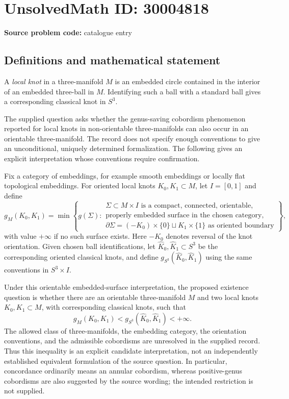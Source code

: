 \documentclass[11pt]{article}
\begin{document}
\section*{UnsolvedMath ID: 30004818}
\textbf{Source problem code:} catalogue entry
\subsection{Definitions and mathematical statement}
A \emph{local knot} in a three-manifold \(M\) is an embedded circle contained in the interior of an embedded three-ball in \(M\). Identifying such a ball with a standard ball gives a corresponding classical knot in \(S^3\).

The supplied question asks whether the genus-saving cobordism phenomenon reported for local knots in non-orientable three-manifolds can also occur in an orientable three-manifold. The record does not specify enough conventions to give an unconditional, uniquely determined formalization. The following gives an explicit interpretation whose conventions require confirmation.

Fix a category of embeddings, for example smooth embeddings or locally flat topological embeddings. For oriented local knots \(K_0,K_1\subset M\), let \(I=[0,1]\) and define
\[
 g_M(K_0,K_1)=\min\left\{g(\Sigma):\begin{array}{l}
 \Sigma\subset M\times I\text{ is a compact, connected, orientable,}\\
 \text{properly embedded surface in the chosen category,}\\
 \partial\Sigma=(-K_0)\times\{0\}\sqcup K_1\times\{1\}
 \text{ as oriented boundary}
 \end{array}\right\},
\]
with value \(+\infty\) if no such surface exists. Here \(-K_0\) denotes reversal of the knot orientation. Given chosen ball identifications, let \(\widehat K_0,\widehat K_1\subset S^3\) be the corresponding oriented classical knots, and define \(g_{S^3}(\widehat K_0,\widehat K_1)\) using the same conventions in \(S^3\times I\).

Under this orientable embedded-surface interpretation, the proposed existence question is whether there are an orientable three-manifold \(M\) and two local knots \(K_0,K_1\subset M\), with corresponding classical knots, such that
\[
 g_M(K_0,K_1)<g_{S^3}(\widehat K_0,\widehat K_1)<+\infty.
\]
The allowed class of three-manifolds, the embedding category, the orientation conventions, and the admissible cobordisms are unresolved in the supplied record. Thus this inequality is an explicit candidate interpretation, not an independently established equivalent formulation of the source question. In particular, concordance ordinarily means an annular cobordism, whereas positive-genus cobordisms are also suggested by the source wording; the intended restriction is not supplied.
\end{document}
